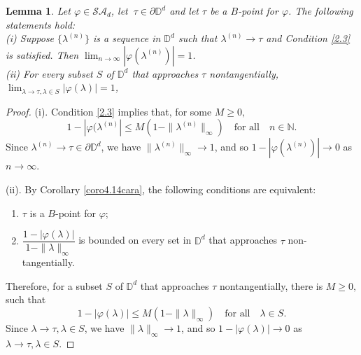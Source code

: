 \documentclass[11pt, reqno]{amsart}
\newtheorem{lemma}[theorem]{Lemma}
\newcommand\1{\boldsymbol {1}}
\newcommand{\D}{\mathbb{D}}
\newcommand{\ph}{\varphi}
\newcommand\la{\lambda}
\numberwithin{equation}{section}
\begin{document}
\begin{lemma}\label{limit-mod}
Let $\varphi\in\mathcal{SA}_{d}$, let $ \ \tau \in \partial \mathbb{D}^{d}$ and let $\tau$ be a $B$-point for $\varphi$.
The following statements hold:\\
{\rm (i)}
Suppose $\{\lambda^{(n)}\}$ is a sequence in $\mathbb{D}^d$ such that $\lambda^{(n)} \rightarrow \tau$ and Condition \eqref{2.3} is satisfied. Then $\lim_{n\to\infty} |\ph(\lambda^{(n)})| =1$.\\
{\rm (ii)} For every subset $S$ of $\D^d$ that approaches $\tau$ nontangentially,  $\lim_{\la\to\tau, \la\in S} |\varphi(\lambda)| =1$,
\end{lemma}
\begin{proof}
(i).  Condition \eqref{2.3} implies that, for some $M\geq 0,$
\[
1-|\ph(\lambda^{(n)}| \leq M(1-\|\lambda^{(n)}\|_{\infty}) \quad \text{for all} \quad n\in\mathbb{N}.
\]
Since $\lambda^{(n)} \to \tau \in \partial \mathbb{D}^d$, we have $\|\lambda^{(n)}\|_{\infty} \to 1$, and so $1-|\ph(\lambda^{(n)})| \to 0$ as $n\to\infty$.

(ii). By Corollary \ref{coro4.14cara},
the following conditions are equivalent:
\begin{enumerate}
    \item $\tau$ is a $B$-point for $\varphi$;
    \item $\dfrac{1-\lvert \varphi(\lambda) \rvert}{1-\|\lambda\|_{\infty}}$ is bounded on every set in $\mathbb{D}^{d}$ that approaches $\tau$ non-tangentially.
\end{enumerate}
Therefore, for a subset $S$ of $\D^d$ that approaches $\tau$ nontangentially, there is $M\geq 0,$ such that
$${1-\lvert \varphi(\lambda) \rvert} \leq M ({1-\|\lambda\|_{\infty}})\quad \text{for all} \quad \lambda \in S.$$ 
Since $\lambda \to \tau, \la\in S$, we have $\|\lambda\|_{\infty} \to 1$, and so $1-|\ph(\lambda)| \to 0$ as 
$\la\to\tau, \la\in S$.
\end{proof}
\end{document}
